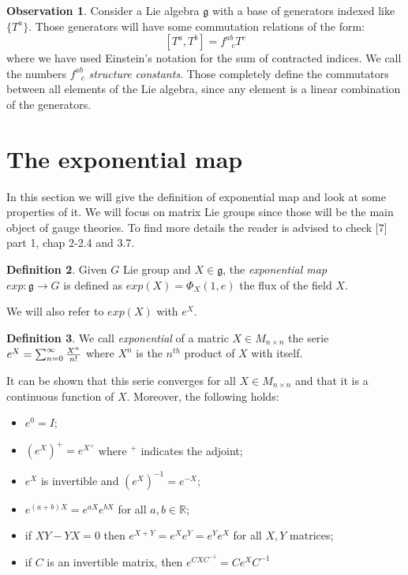 \documentclass[12pt,a4paper]{report}
\theoremstyle{definition}
\newtheorem{Def}{Definition}[chapter]
\theoremstyle{Theorem}
\theoremstyle{definition}
\theoremstyle{definition}
\newtheorem{Obs}[Def]{Observation}
\begin{document}
		\begin{Obs}
			Consider a Lie algebra $\mathfrak{g}$ with a base of generators indexed like $\{T^a\}$. Those generators will have some commutation relations of the form:
			$$[T^a,T^b]=f^{ab}_{\hspace{9pt}c}T^c$$
			where we have used Einstein's notation for the sum of contracted indices. We call the numbers $f^{ab}_{\hspace{9pt}c}$ \textit{structure constants}. Those completely define the commutators between all elements of the Lie algebra, since any element is a linear combination of the generators.
		\end{Obs}
		\section{The exponential map}
		In this section we will give the definition of exponential map and look at some properties of it. We will focus on matrix Lie groups since those will be the main object of gauge theories.
		To find more details the reader is advised to check [7] part 1, chap 2-2.4 and 3.7.
		\begin{Def}
			Given $G$ Lie group and $X\in\mathfrak{g}$, the \textit{exponential map} \\$exp:\mathfrak{g}\rightarrow G$ is defined as $exp(X)=\Phi_X(1,e)$ the flux of the field $X$.
		\end{Def}
		We will also refer to $exp(X)$ with $e^X$.
		\begin{Def}
			We call \textit{exponential} of a matric $X\in M_{n\times n}$ the serie \\$e^X=\sum_{n=0}^{\infty}{X^n\over n! }$ where $X^n$ is the $n^{th}$ product of $X$ with itself.
		\end{Def}
		It can be shown that this serie converges for all $X\in M_{n\times n}$ and that it is a continuous function of $X$. Moreover, the following holds:
		\begin{itemize}
			\item $e^0=I$;
			\item $(e^X)^+=e^{X^+}$ where $^+$ indicates the adjoint;
			\item $e^X$ is invertible and $(e^X)^{-1}=e^{-X}$;
			\item $e^{(a+b)X}=e^{aX}e^{bX}$ for all $a,b\in\mathbb{R}$;
			\item if $XY-YX=0$ then $e^{X+Y}=e^Xe^Y=e^Ye^X$ for all $X,Y$ matrices;\\
			\item if $C$ is an invertible matrix, then $e^{CXC^{-1}}=Ce^XC^{-1}$
		\end{itemize} 
\end{document}
